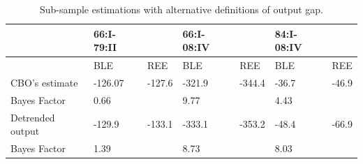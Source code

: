 \begin{table}[!htbp]
\centering

\begin{tabular}{l||ll||ll||ll}
& 66:I-79:II & & 66:I-08:IV  & & 84:I-08:IV & \\
\hline
\hline

& BLE & REE & BLE & REE & BLE & REE  \\
\hline
\hline

CBO's estimate & -126.07 & -127.6 & -321.9 & -344.4 & -36.7 & -46.9\\
\hline
Bayes Factor & 0.66 &   & 9.77 &   & 4.43 &  \\
\hline
\hline
Detrended output & -129.9 & -133.1 & -333.1 & -353.2 & -48.4 & -66.9\\
\hline
Bayes Factor & 1.39 &   & 8.73 &   & 8.03 &  \\
\end{tabular}
\caption{Sub-sample estimations with alternative definitions of output gap. } 
\label{nkm_alt_subs}
\end{table}


\FloatBarrier
